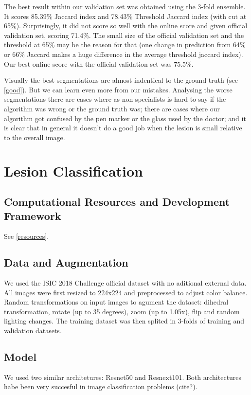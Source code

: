 \documentclass[conference]{IEEEtran}
\begin{document}
The best result within our validation set was obtained using the 3-fold ensemble.  It scores 85.39\% Jaccard index and 78.43\% Threshold Jaccard index (with cut at 65\%). Surprisingly, it did not score so well with the online score and given official validation set, scoring 71.4\%.  The small size of the official validation set and the threshold at 65\% may be the reason for that (one change in prediction from 64\% or 66\% Jaccard makes a huge difference in the average threshold jaccard index). Our best online score with the official validation set was 75.5\%. 

Visually the best segmentations are almost indentical to the ground truth (see \ref{good}). But we can learn even more from our mistakes. Analysing the worse segmentations there are cases where as non specialists is hard to say if the algorithm was wrong or the ground truth was; there are cases where our algorithm got confused by the pen marker or the glass used by the doctor; and it is clear that in general it doesn't do a good job when the lesion is small relative to the overall image. 

\section{Lesion Classification}
\label{classification}
\subsection{Computational Resources and Development Framework}
See \ref{resources}.
\subsection{Data and Augmentation}
We used the ISIC 2018 Challenge official dataset with no aditional external data. All images were first resized to 224x224 and preprocessed to adjust color balance. Random transformations on input images to agument the dataset: dihedral transformation, rotate (up to 35 degrees), zoom (up to 1.05x), flip and random lighting changes. The training dataset was then splited in 3-folds of training and validation datasets.  

\subsection{Model}
We used two similar architetures: Resnet50 and Resnext101. Both architectures habe been very succesful in image classification problems (cite?). 
\end{document}
